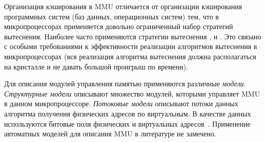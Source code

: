 Организация кэширования в MMU отличается от организации кэширования
программных систем (баз данных, операционных систем) тем, что в микропроцессорах
применяется довольно ограниченный набор стратегий вытеснения. Наиболее часто применяются
стратегии вытеснения \LRU, \FIFO и \PseudoLRU. Это связано с особыми требованиями
к эффективности реализации алгоритмов вытеснения в микропроцессорах (вся реализация
алгоритма вытеснения должна располагаться на кристалле и не давать большой проигрыш по времени).

%
%
%
%
%
%
%
%
%
%
%
%


Для описания модулей управления памятью применяются различные
\emph{модели}. \emph{Структурные модели} описывают множество
модулей, которыми управляет MMU в данном микропроцессоре.
\emph{Потоковые модели} описывают потоки данных алгоритма получения
физических адресов по виртуальным. В качестве данных используются
битовые поля физических и виртуальных
адресов~\cite{FundamentalOfComputerOrganizationAndDesign}. %
Применение автоматных моделей для описания MMU в литературе не
замечено.



